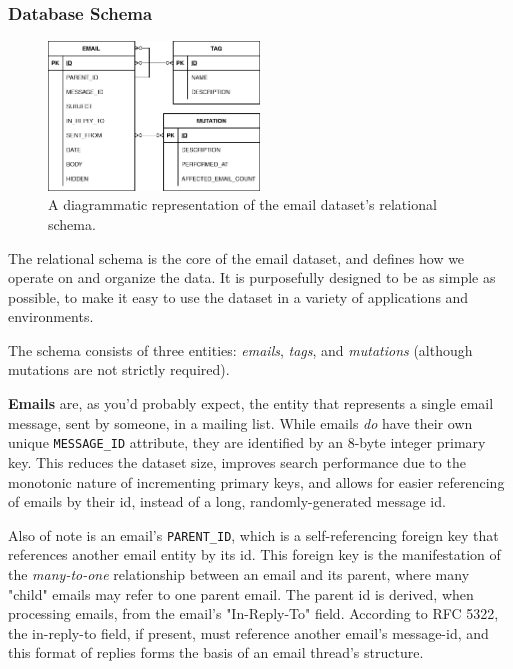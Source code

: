 \documentclass[a4paper, 12pt]{article}
\begin{document}
		\subsubsection{Database Schema}
			\begin{figure}
				\label{fig:schema}
				\includegraphics[width=0.5\textwidth]{img/simple_schema.png}
				\caption{A diagrammatic representation of the email dataset's relational schema.}
			\end{figure}
			The relational schema is the core of the email dataset, and defines how we operate on and organize the data. It is purposefully designed to be as simple as possible, to make it easy to use the dataset in a variety of applications and environments.
			
			The schema consists of three entities: \textit{emails}, \textit{tags}, and \textit{mutations} (although mutations are not strictly required).
			
			\textbf{Emails} are, as you'd probably expect, the entity that represents a single email message, sent by someone, in a mailing list. While emails \textit{do} have their own unique \texttt{MESSAGE\_ID} attribute\autocite{rfc5322}, they are identified by an 8-byte integer primary key. This reduces the dataset size, improves search performance due to the monotonic nature of incrementing primary keys, and allows for easier referencing of emails by their id, instead of a long, randomly-generated message id.
			
			Also of note is an email's \texttt{PARENT\_ID}, which is a self-referencing foreign key that references another email entity by its id. This foreign key is the manifestation of the \textit{many-to-one} relationship between an email and its parent, where many "child" emails may refer to one parent email. The parent id is derived, when processing emails, from the email's "In-Reply-To" field. According to RFC 5322, the in-reply-to field, if present, must reference another email's message-id, and this format of replies forms the basis of an email thread's structure\autocite{rfc5322}.
			
\end{document}

